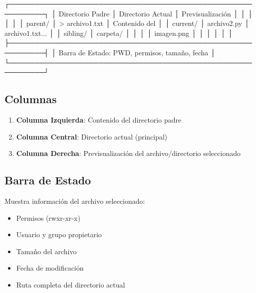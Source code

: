 \documentclass[
  doc,
  floatsintext,
  longtable,
  a4paper,
  nolmodern,
  notxfonts,
  notimes,
  12pt,
  colorlinks=true,linkcolor=blue,citecolor=blue,urlcolor=blue]{apa7}
\newenvironment{Shaded}{\begin{snugshade}}{\end{snugshade}}
\newcommand{\ExtensionTok}[1]{\textcolor[rgb]{0.00,0.23,0.31}{#1}}
\newcommand{\NormalTok}[1]{\textcolor[rgb]{0.00,0.23,0.31}{#1}}
\newcommand{\OperatorTok}[1]{\textcolor[rgb]{0.37,0.37,0.37}{#1}}
\providecommand{\tightlist}{%
  \setlength{\itemsep}{0pt}\setlength{\parskip}{0pt}}
\begin{document}
\begin{Shaded}
\begin{Highlighting}[]
\ExtensionTok{┌─────────────────────────────────────────────────────────┐}
\ExtensionTok{│}\NormalTok{ Directorio Padre │ Directorio Actual │ Previsualización │}
\ExtensionTok{│}\NormalTok{                  │                   │                  │}
\ExtensionTok{│}\NormalTok{  parent/         │ }\OperatorTok{\textgreater{}}\NormalTok{ archivo1.txt    │ Contenido del    │}
\ExtensionTok{│}\NormalTok{  current/        │   archivo2.py     │ archivo1.txt...  │}
\ExtensionTok{│}\NormalTok{  sibling/        │   carpeta/        │                  │}
\ExtensionTok{│}\NormalTok{                  │   imagen.png      │                  │}
\ExtensionTok{│}\NormalTok{                  │                   │                  │}
\ExtensionTok{├─────────────────────────────────────────────────────────┤}
\ExtensionTok{│}\NormalTok{ Barra de Estado: PWD, permisos, tamaño, fecha           │}
\ExtensionTok{└─────────────────────────────────────────────────────────┘}
\end{Highlighting}
\end{Shaded}

\subsection{Columnas}\label{columnas}

\begin{enumerate}
\def\labelenumi{\arabic{enumi}.}
\tightlist
\item
  \textbf{Columna Izquierda}: Contenido del directorio padre
\item
  \textbf{Columna Central}: Directorio actual (principal)
\item
  \textbf{Columna Derecha}: Previsualización del archivo/directorio
  seleccionado
\end{enumerate}

\subsection{Barra de Estado}\label{barra-de-estado}

Muestra información del archivo seleccionado:

\begin{itemize}
\tightlist
\item
  Permisos (rwxr-xr-x)
\item
  Usuario y grupo propietario
\item
  Tamaño del archivo
\item
  Fecha de modificación
\item
  Ruta completa del directorio actual
\end{itemize}
\end{document}
